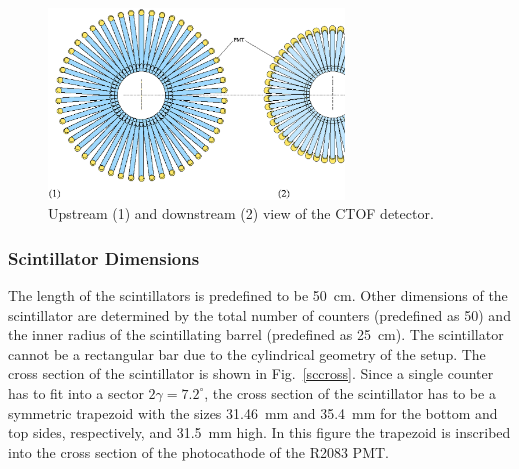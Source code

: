 \begin{figure}[htbp]
\centering
\includegraphics[width=0.7\textwidth]{bentlgupdownstream.ps}
\caption{\small{Upstream (1) and downstream (2) view of the CTOF detector.}}
\label{bentlgud03}
\end{figure}

\subsubsection{Scintillator Dimensions}

The length of the scintillators is predefined to be 50~cm.  Other dimensions  
of the scintillator are determined by the total number of counters 
(predefined as 50) and the inner radius of the scintillating barrel 
(predefined as 25~cm).  The scintillator cannot be a rectangular bar due to 
the cylindrical geometry of the setup.  The cross section of the scintillator 
is shown in Fig.~\ref{sccross}.  Since a single counter has to fit into a 
sector $2\gamma=7.2^\circ$, the cross section of the scintillator has to be a 
symmetric trapezoid with the sizes 31.46~mm and 35.4~mm for the bottom and 
top sides, respectively, and 31.5~mm high.  In this figure the trapezoid is 
inscribed into the cross section of the photocathode of the R2083 PMT.  

